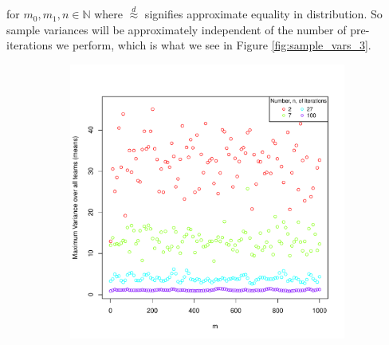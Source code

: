 \documentclass[11pt]{article} %
\begin{document}
for $m_0, m_1, n \in \mathbb{N}$ where $\overset{d}{\approx}$ signifies approximate equality in distribution. So sample variances will be approximately independent of the number of pre-iterations we perform, which is what we see in Figure \ref{fig:sample_vars_3}.
\begin{figure}[h]
	\centering
	\begin{subfigure}{0.48\textwidth}
		\centering
		\includegraphics[width=1.0\textwidth]{"../R File/var_means_3"}
	\end{subfigure}%
	\hspace{0.04\textwidth}%
	\begin{subfigure}{0.48\textwidth}
		\centering

\end{subfigure}
\end{figure}
\end{document}
